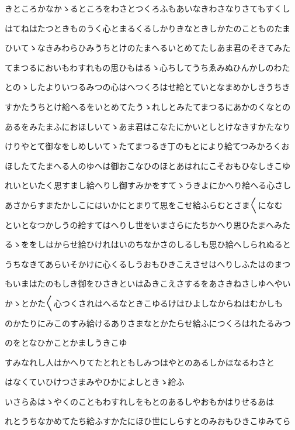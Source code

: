 \documentclass[a4paper,11pt,landscape]{ltjtarticle}
\begin{document}
きところかなかゝるところをわさとつくろふもあいなきわさなりさてもすくし
\par\medskip
はてねはたつときものうく心とまるくるしかりきなときしかたのことものたま
\par\medskip
ひいてゝなきみわらひみうちとけのたまへるいとめてたしあま君のそきてみた
\par\medskip
てまつるにおいもわすれもの思ひもはるゝ心ちしてうちゑみぬひんかしのわた
\par\medskip
とのゝしたよりいつるみつの心はへつくろはせ給とていとなまめかしきうちき
\par\medskip
すかたうちとけ給へるをいとめてたうゝれしとみたてまつるにあかのくなとの
\par\medskip
あるをみたまふにおほしいてゝあま君はこなたにかいとしとけなきすかたなり
\par\medskip
けりやとて御なをしめしいてゝたてまつるき丁のもとにより給てつみかろくお
\par\medskip
ほしたてたまへる人のゆへは御おこなひのほとあはれにこそおもひなしきこゆ
\par\medskip
れいといたく思すまし給へりし御すみかをすてゝうきよにかへり給へる心さし
\par\medskip
あさからすまたかしこにはいかにとまりて思をこせ給ふらむとさま〱になむ
\par\medskip
といとなつかしうの給すてはへりし世をいまさらにたちかへり思ひたまへみた
\par\medskip
るゝををしはからせ給ひけれはいのちなかさのしるしも思ひ給へしられぬると
\par\medskip
うちなきてあらいそかけに心くるしうおもひきこえさせはへりしふたはのまつ
\par\medskip
もいまはたのもしき御をひさきといはゐきこえさするをあさきねさしゆへやい
\par\medskip
かゝとかた〱心つくされはへるなときこゆるけはひよしなからねはむかしも
\par\medskip
のかたりにみこのすみ給けるありさまなとかたらせ給ふにつくろはれたるみつ
\par\medskip
のをとなひかことかましうきこゆ
\par\medskip
すみなれし人はかへりてたとれともしみつはやとのあるしかほなるわさと
\par\medskip
はなくていひけつさまみやひかによしときゝ給ふ
\par\medskip
いさらゐはゝやくのこともわすれしをもとのあるしやおもかはりせるあは
\par\medskip
れとうちなかめてたち給ふすかたにほひ世にしらすとのみおもひきこゆみてら
\par\medskip
\end{document}
